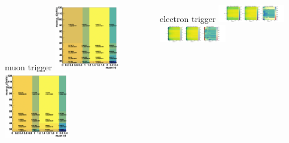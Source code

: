 \begin{frame}{}
\smaller
    \begin{columns}
     \begin{block}{muon trigger}
        \centering
        \includegraphics[width=0.45\textwidth]{chapters/Analysis/sectionCalibration/figures/trigger/muTrSF_BCDEF.png}
        \includegraphics[width=0.45\textwidth]{chapters/Analysis/sectionCalibration/figures/trigger/muTrSF_GH.png}
    \end{block} 
    
     \begin{block}{electron trigger}
        \centering
        \includegraphics[width=0.45\textwidth, trim=24cm 0 3.7cm 0, clip]{chapters/Analysis/sectionCalibration/figures/eTrigger/eff2d_BCDEF.png}
        \includegraphics[width=0.45\textwidth, trim=24cm 0 3.7cm 0, clip]{chapters/Analysis/sectionCalibration/figures/eTrigger/eff2d_GH.png}
    \end{block}
    \end{columns}
    

\end{frame}
